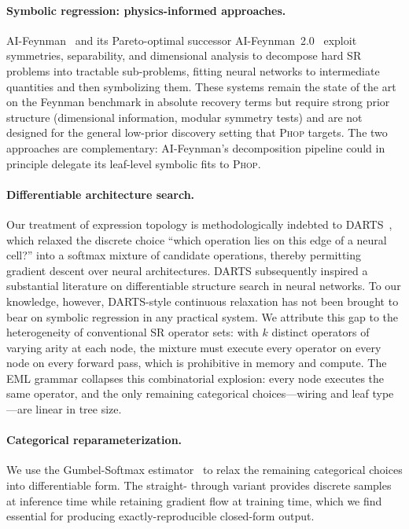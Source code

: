 \documentclass{article}
\begin{document}
\paragraph{Symbolic regression: physics-informed approaches.}
AI-Feynman~\cite{udrescu2020aifeynman} and its Pareto-optimal successor
AI-Feynman~2.0~\cite{udrescu2020aifeynman2} exploit symmetries,
separability, and dimensional analysis to decompose hard SR problems
into tractable sub-problems, fitting neural networks to intermediate
quantities and then symbolizing them. These systems remain the state
of the art on the Feynman benchmark in absolute recovery terms but
require strong prior structure (dimensional information, modular
symmetry tests) and are not designed for the general low-prior
discovery setting that \textsc{Phop} targets. The two approaches are
complementary: AI-Feynman's decomposition pipeline could in principle
delegate its leaf-level symbolic fits to \textsc{Phop}.

\paragraph{Differentiable architecture search.}
Our treatment of expression topology is methodologically indebted to
DARTS~\cite{liu2019darts}, which relaxed the discrete choice ``which
operation lies on this edge of a neural cell?'' into a softmax mixture
of candidate operations, thereby permitting gradient descent over
neural architectures. DARTS subsequently inspired a substantial
literature on differentiable structure search in neural networks. To
our knowledge, however, DARTS-style continuous relaxation has not been
brought to bear on symbolic regression in any practical system. We
attribute this gap to the heterogeneity of conventional SR operator
sets: with $k$ distinct operators of varying arity at each node, the
mixture must execute every operator on every node on every forward
pass, which is prohibitive in memory and compute. The EML grammar
collapses this combinatorial explosion: every node executes the same
operator, and the only remaining categorical choices—wiring and leaf
type—are linear in tree size.

\paragraph{Categorical reparameterization.}
We use the Gumbel-Softmax
estimator~\cite{jang2017gumbel,maddison2017concrete} to relax the
remaining categorical choices into differentiable form. The straight-
through variant provides discrete samples at inference time while
retaining gradient flow at training time, which we find essential for
producing exactly-reproducible closed-form output.
\end{document}
